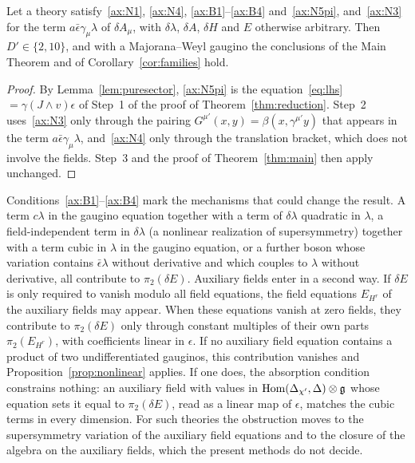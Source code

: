 \begin{proposition}
\label{prop:nonlinear}
Let a theory satisfy~\ref{ax:N1}, \ref{ax:N4}, \ref{ax:B1}--\ref{ax:B4} and~\ref{ax:N5pi}, and~\ref{ax:N3} for the term $a\bar\epsilon\gamma_\mu\lambda$ of $\delta A_\mu$, with $\delta\lambda$, $\delta A$, $\delta H$ and $E$ otherwise arbitrary. Then $D'\in\{2,10\}$, and with a Majorana--Weyl gaugino the conclusions of the Main Theorem and of Corollary~\ref{cor:families} hold.
\end{proposition}

\begin{proof}
By Lemma~\ref{lem:puresector}, \ref{ax:N5pi} is the equation~\eqref{eq:lhs}$=\gamma(J\wedge v)\epsilon$ of Step~1 of the proof of Theorem~\ref{thm:reduction}. Step~2 uses~\ref{ax:N3} only through the pairing $G^{\mu'}(x,y)=\beta(x,\gamma^{\mu'}y)$ that appears in the term $a\bar\epsilon\gamma_\mu\lambda$, and~\ref{ax:N4} only through the translation bracket, which does not involve the fields. Step~3 and the proof of Theorem~\ref{thm:main} then apply unchanged.
\end{proof}

\begin{remark}
\label{rem:auxiliary}
Conditions~\ref{ax:B1}--\ref{ax:B4} mark the mechanisms that could change the result. A term $c\lambda$ in the gaugino equation together with a term of $\delta\lambda$ quadratic in $\lambda$, a field-independent term in $\delta\lambda$ (a nonlinear realization of supersymmetry) together with a term cubic in $\lambda$ in the gaugino equation, or a further boson whose variation contains $\bar\epsilon\lambda$ without derivative and which couples to $\lambda$ without derivative, all contribute to $\pi_2(\delta E)$. Auxiliary fields enter in a second way. If $\delta E$ is only required to vanish modulo all field equations, the field equations $E_{H^r}$ of the auxiliary fields may appear. When these equations vanish at zero fields, they contribute to $\pi_2(\delta E)$ only through constant multiples of their own parts $\pi_2(E_{H^r})$, with coefficients linear in $\epsilon$. If no auxiliary field equation contains a product of two undifferentiated gauginos, this contribution vanishes and Proposition~\ref{prop:nonlinear} applies. If one does, the absorption condition constrains nothing: an auxiliary field with values in $\operatorname{Hom}(\Delta_{\chi'},\Delta)\otimes\mathfrak{g}$ whose equation sets it equal to $\pi_2(\delta E)$, read as a linear map of $\epsilon$, matches the cubic terms in every dimension. For such theories the obstruction moves to the supersymmetry variation of the auxiliary field equations and to the closure of the algebra on the auxiliary fields, which the present methods do not decide.
\end{remark}


